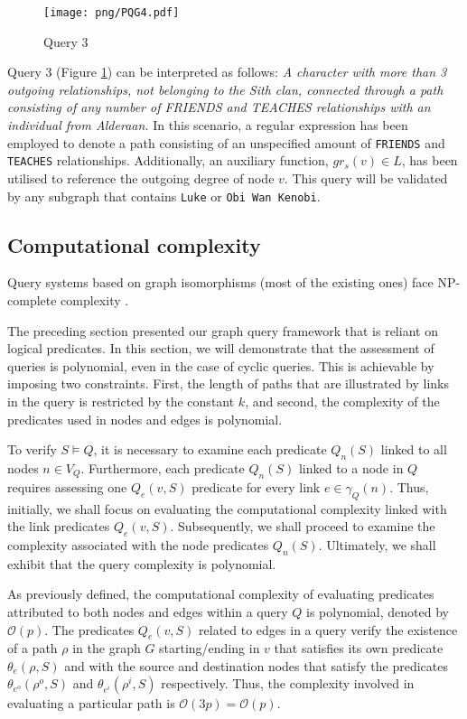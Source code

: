 \documentclass{article}%
\begin{document}
\begin{figure}[h]
    \begin{center}
        \texttt{[image: png/PQG4.pdf]}
    \end{center}
    \caption{%
        Query 3
    }%
    \label{pqg4}
\end{figure}

Query 3 (Figure \ref{pqg4}) can be interpreted as follows: \textit{A character with more than 3 outgoing relationships, not belonging to the Sith clan, connected through a path consisting of any number of FRIENDS and TEACHES relationships with an individual from Alderaan.} In this scenario, a regular expression has been employed to denote a path consisting of an unspecified amount of \texttt{FRIENDS} and \texttt{TEACHES} relationships. Additionally, an auxiliary function, $gr_s(v) \in L$, has been utilised to reference the outgoing degree of node $v$. This query will be validated by any subgraph that contains \texttt{Luke} or \texttt{Obi Wan Kenobi}.

\subsection{Computational complexity}
\label{cc}
Query systems based on graph isomorphisms (most of the existing ones) face NP-complete complexity  \citep{karp1975computational,Cook:1971:CTP:800157.805047}.

The preceding section presented our graph query framework that is reliant on logical predicates. In this section, we will demonstrate that the assessment of queries is polynomial, even in the case of cyclic queries. This is achievable by imposing two constraints. First, the length of paths that are illustrated by links in the query is restricted by the constant $k$, and second, the complexity of the predicates used in nodes and edges is polynomial.

To verify $S\models Q$, it is necessary to examine each predicate $Q_n(S)$ linked to all nodes $n \in V_Q$. Furthermore, each predicate $Q_n(S)$ linked to a node in $Q$ requires assessing one $Q_e(v,S)$ predicate for every link $e\in\gamma_Q(n)$. Thus, initially, we shall focus on evaluating the computational complexity linked with the link predicates $Q_e(v,S)$. Subsequently, we shall proceed to examine the complexity associated with the node predicates $Q_n(S)$. Ultimately, we shall exhibit that the query complexity is polynomial.

As previously defined, the computational complexity of evaluating predicates attributed to both nodes and edges within a query $Q$ is polynomial, denoted by $\mathcal{O}(p)$. The predicates $Q_e(v,S)$ related to edges in a query verify the existence of a path $\rho$ in the graph $G$ starting/ending in $v$ that satisfies its own predicate $\theta_e (\rho, S)$ and with the source and destination nodes that satisfy the predicates $\theta_{e^o} (\rho^o , S)$ and $\theta_{e^i} (\rho^i , S)$ respectively. Thus, the complexity involved in evaluating a particular path is $\mathcal{O}(3p) = \mathcal{O}(p)$. 
\end{document}
